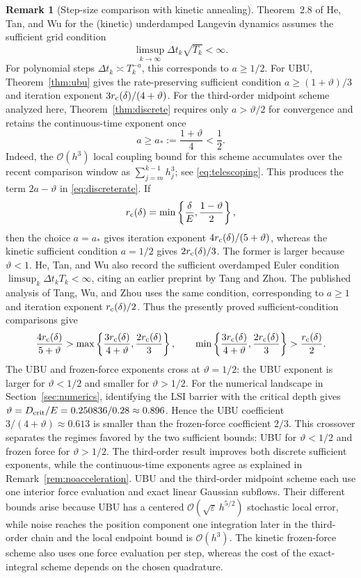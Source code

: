 \documentclass[11pt]{article}
\theoremstyle{definition}
\newtheorem{remark}[theorem]{Remark}
\newcommand{\eps}{\varepsilon}
\begin{document}
\begin{remark}[Step-size comparison with kinetic annealing]
\label{rem:stepsizecomparison}
Theorem~2.8 of He, Tan, and Wu \cite{HeTanWu2024} for the (kinetic) underdamped Langevin dynamics 
assumes the sufficient grid
condition
\[
 \limsup_{k\to\infty}\Delta t_k\sqrt{T_k}<\infty.
\]
For polynomial steps $\Delta t_k\asymp T_k^{-a}$, this corresponds to
$a\geq1/2$. For UBU, Theorem~\ref{thm:ubu} gives the rate-preserving
sufficient condition $a\geq(1+\vartheta)/3$ and iteration exponent
$3r_{\rm c}(\delta)/(4+\vartheta)$. For the third-order midpoint scheme
analyzed here,
Theorem~\ref{thm:discrete} requires only
$a>\vartheta/2$ for convergence and retains the continuous-time exponent once
\[
 a\geq a_*:=\frac{1+\vartheta}{4}<\frac12.
\]
Indeed, the $\mathcal{O}(h^3)$ local coupling bound for this scheme accumulates over the
recent comparison window as $\sum_{j=m}^{k-1}h_j^3$; see
\eqref{eq:telescoping}.
This produces the term $2a-\vartheta$ in
\eqref{eq:discreterate}. If
\[
 r_{\rm c}(\delta)=\min\left\{\frac\delta E,
                    \frac{1-\vartheta}{2}\right\},
\]
then the choice $a=a_*$ gives iteration exponent
$4r_{\rm c}(\delta)/(5+\vartheta)$, whereas the kinetic sufficient condition
$a=1/2$ gives $2r_{\rm c}(\delta)/3$. The former is larger because
$\vartheta<1$. He, Tan, and Wu \cite[Remark~2.9(iv)]{HeTanWu2024} also record
the sufficient overdamped Euler condition
$\limsup_k\Delta t_kT_k<\infty$, citing an earlier preprint by Tang and Zhou.
The published analysis of Tang, Wu, and Zhou \cite{TangWuZhou2024} uses the
same condition, corresponding to $a\geq1$ and iteration exponent
$r_{\rm c}(\delta)/2$. Thus the presently proved
sufficient-condition comparisons give
\[
 \frac{4r_{\rm c}(\delta)}{5+\vartheta}
 >\max\left\{
       \frac{3r_{\rm c}(\delta)}{4+\vartheta},
       \frac{2r_{\rm c}(\delta)}3
      \right\},
 \qquad
 \min\left\{
       \frac{3r_{\rm c}(\delta)}{4+\vartheta},
       \frac{2r_{\rm c}(\delta)}3
      \right\}
 >\frac{r_{\rm c}(\delta)}2.
\]
The UBU and frozen-force exponents cross at $\vartheta=1/2$: the UBU
exponent is larger for $\vartheta<1/2$ and smaller for $\vartheta>1/2$.
For the numerical landscape in Section~\ref{sec:numerics}, identifying the LSI
barrier with the critical depth gives
$\vartheta=D_{\rm crit}/E=0.250836/0.28\approx0.896$. Hence the UBU
coefficient $3/(4+\vartheta)\approx0.613$ is smaller than the frozen-force
coefficient $2/3$. This crossover separates the regimes favored by the two
sufficient bounds: UBU for $\vartheta<1/2$ and frozen force for
$\vartheta>1/2$. The third-order result improves both discrete sufficient
exponents, while the continuous-time exponents agree as explained in
Remark~\ref{rem:noacceleration}. UBU and the third-order midpoint
scheme each use one interior force evaluation and exact linear Gaussian
subflows. Their different bounds arise because UBU has a centered
$\mathcal{O}(\sqrt\eps\,h^{5/2})$ stochastic local error, while noise reaches the position
component one integration later in the third-order chain and the local endpoint
bound is $\mathcal{O}(h^3)$. The kinetic frozen-force scheme also uses one force evaluation
per step, whereas the cost of the exact-integral scheme depends on the chosen
quadrature.
\end{remark}
\end{document}

